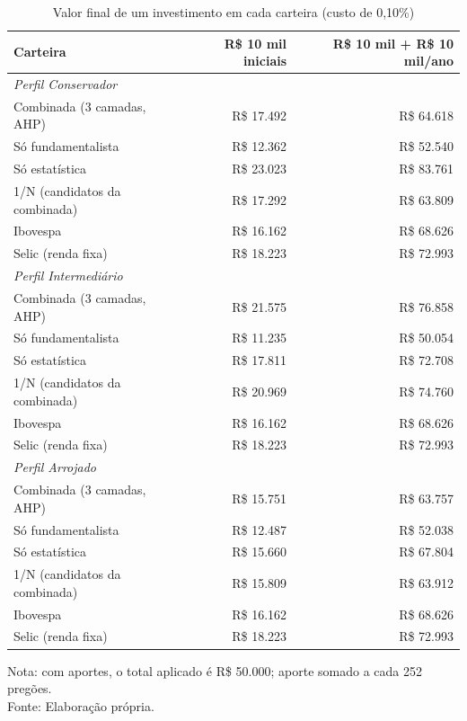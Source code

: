 \begin{table}[htbp]
\centering
\caption{Valor final de um investimento em cada carteira (custo de 0,10\%)}
\label{tab:patrimonio}
\footnotesize
\begin{tabular}{lrr}
\toprule
\textbf{Carteira} & \textbf{R\$ 10 mil iniciais} & \textbf{R\$ 10 mil + R\$ 10 mil/ano} \\
\midrule
\multicolumn{3}{l}{\textit{Perfil Conservador}} \\
Combinada (3 camadas, AHP) & R\$ 17.492 & R\$ 64.618 \\
Só fundamentalista & R\$ 12.362 & R\$ 52.540 \\
Só estatística & R\$ 23.023 & R\$ 83.761 \\
1/N (candidatos da combinada) & R\$ 17.292 & R\$ 63.809 \\
Ibovespa & R\$ 16.162 & R\$ 68.626 \\
Selic (renda fixa) & R\$ 18.223 & R\$ 72.993 \\
\midrule
\multicolumn{3}{l}{\textit{Perfil Intermediário}} \\
Combinada (3 camadas, AHP) & R\$ 21.575 & R\$ 76.858 \\
Só fundamentalista & R\$ 11.235 & R\$ 50.054 \\
Só estatística & R\$ 17.811 & R\$ 72.708 \\
1/N (candidatos da combinada) & R\$ 20.969 & R\$ 74.760 \\
Ibovespa & R\$ 16.162 & R\$ 68.626 \\
Selic (renda fixa) & R\$ 18.223 & R\$ 72.993 \\
\midrule
\multicolumn{3}{l}{\textit{Perfil Arrojado}} \\
Combinada (3 camadas, AHP) & R\$ 15.751 & R\$ 63.757 \\
Só fundamentalista & R\$ 12.487 & R\$ 52.038 \\
Só estatística & R\$ 15.660 & R\$ 67.804 \\
1/N (candidatos da combinada) & R\$ 15.809 & R\$ 63.912 \\
Ibovespa & R\$ 16.162 & R\$ 68.626 \\
Selic (renda fixa) & R\$ 18.223 & R\$ 72.993 \\
\bottomrule
\end{tabular}

\vspace{0.2cm}
\small Nota: com aportes, o total aplicado é R\$ 50.000; aporte somado a cada 252 pregões.\\
Fonte: Elaboração própria.
\end{table}
